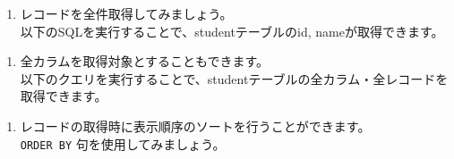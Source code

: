 \begin{Shaded}
\begin{Highlighting}[]
\end{Highlighting}
\end{Shaded}

\begin{enumerate}
\def\labelenumi{\arabic{enumi}.}
\setcounter{enumi}{1}
\tightlist
\item
  レコードを全件取得してみましょう。\\
  以下のSQLを実行することで、studentテーブルのid, nameが取得できます。
\end{enumerate}

\begin{Shaded}
\begin{Highlighting}[]
 
\end{Highlighting}
\end{Shaded}

\begin{enumerate}
\def\labelenumi{\arabic{enumi}.}
\setcounter{enumi}{2}
\tightlist
\item
  全カラムを取得対象とすることもできます。\\
  以下のクエリを実行することで、studentテーブルの全カラム・全レコードを取得できます。
\end{enumerate}

\begin{Shaded}
\begin{Highlighting}[]
 \OperatorTok{*} 
\end{Highlighting}
\end{Shaded}

\begin{enumerate}
\def\labelenumi{\arabic{enumi}.}
\setcounter{enumi}{3}
\tightlist
\item
  レコードの取得時に表示順序のソートを行うことができます。\\
  \texttt{ORDER\ BY} 句を使用してみましょう。
\end{enumerate}

\begin{Shaded}
\begin{Highlighting}[]
 \OperatorTok{*}  \NormalTok{;}

 \OperatorTok{*}  \NormalTok{;}
\end{Highlighting}
\end{Shaded}

